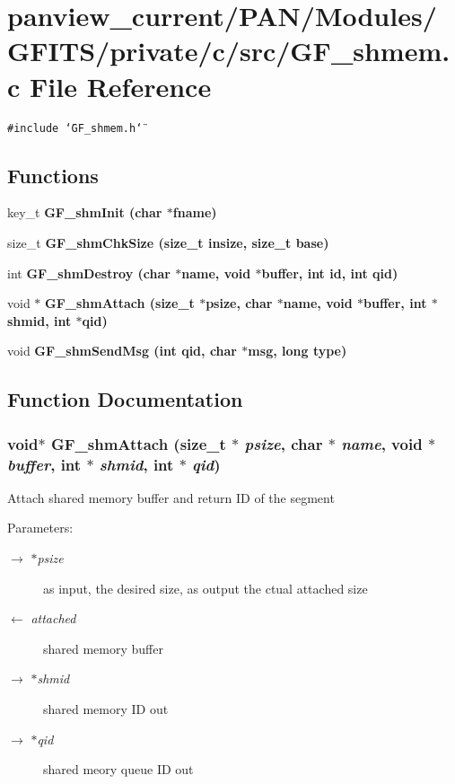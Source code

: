 \section{panview\_\-current/PAN/Modules/GFITS/private/c/src/GF\_\-shmem.c File Reference}
\label{GF__shmem_8c}
{\tt \#include \char`\"{}GF\_\-shmem.h\char`\"{}}\par
\subsection*{Functions}
\begin{CompactItemize}
\item 
key\_\-t \bf{GF\_\-shm\-Init} (char $\ast$fname)
\item 
size\_\-t \bf{GF\_\-shm\-Chk\-Size} (size\_\-t insize, size\_\-t base)
\item 
int \bf{GF\_\-shm\-Destroy} (char $\ast$name, void $\ast$buffer, int id, int qid)
\item 
void $\ast$ \bf{GF\_\-shm\-Attach} (size\_\-t $\ast$psize, char $\ast$name, void $\ast$buffer, int $\ast$\bf{shmid}, int $\ast$qid)
\item 
void \bf{GF\_\-shm\-Send\-Msg} (int qid, char $\ast$msg, long type)
\end{CompactItemize}


\subsection{Function Documentation}
\subsubsection{\setlength{\rightskip}{0pt plus 5cm}void$\ast$ GF\_\-shm\-Attach (size\_\-t $\ast$ {\em psize}, char $\ast$ {\em name}, void $\ast$ {\em buffer}, int $\ast$ {\em shmid}, int $\ast$ {\em qid})}\label{GF__shmem_8c_a37edee6aebb1f0e00ea391a47b51456}


Attach shared memory buffer and return ID of the segment \begin{Desc}
\item[Parameters:]
\begin{description}
\item[\mbox{$\rightarrow$} {\em $\ast$psize}]as input, the desired size, as output the ctual attached size \item[\mbox{$\leftarrow$} {\em attached}]shared memory buffer \item[\mbox{$\rightarrow$} {\em $\ast$shmid}]shared memory ID out \item[\mbox{$\rightarrow$} {\em $\ast$qid}]shared meory queue ID out \end{description}
\end{Desc}
